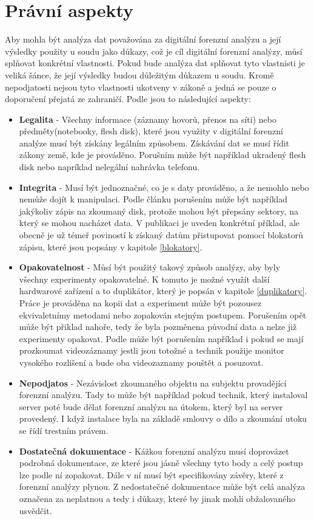 \documentclass[thesis=B,czech]{FITthesis}[2012/06/26]
\begin{document}
\section{Právní aspekty}

Aby mohla být analýza dat považována za digitální forenzní analýzu a její výsledky použity u soudu jako důkazy, což je cíl digitální forenzní analýzy, můsí splňovat konkrétní vlastnosti. Pokud bude analýza dat splňovat tyto vlastnisti je veliká šánce, že její výsledky budou důležitým důkazem u soudu. Kromě nepodjatosti nejsou tyto vlastnosti ukotveny v zákoně a jedná se pouze o doporučení přejatá ze zahraničí. Podle \cite{svetlik2010digitalni} jsou to následující aspekty:

\begin{itemize}

\item \textbf{Legalita} - Všechny informace (záznamy hovorů, přenos na síti) nebo předměty(notebooky, flesh disk), které jsou využity v digitální forenzní analýze musí být získány legálním způsobem. Získávání dat se musí řídit zákony země, kde je prováděno. Porušním může být například ukradený flesh disk nebo napríklad nelegální nahrávka telefonu. 
\item \textbf{Integrita} - Musí být jednoznačné, co je s daty prováděno, a že nemohlo nebo nemůže dojít k manipulaci. Podle článku \cite{svetlik2010digitalni} porušením může být například jakýkoliv zápis na zkoumaný disk, protože mohou být přepsány sektory, na který se mohou nacházet data. V publikaci je uveden konkrétní příklad, ale obecně je už témeř poviností k získaný datům přistupovat pomocí blokatorů zápisu, které jsou popsány v kapitole \ref{blokatory}.
\item \textbf{Opakovatelnost} - Můsí být použitý takový způsob analýzy, aby byly všechny experimenty opakovatelné. K tomuto je možné využít další hardwarové zařízení a to duplikátor, který je popsán v kapitole \ref{duplikatory}. Práce je prováděna na kopii dat a experiment může být pozousez ekvivaletnímy metodami nebo zopakován stejným postupem. Porušením opět může být přiklad nahoře, tedy že byla pozměnena původní data a nelze již experimenty opakovat. Podle \cite{svetlik2010digitalni} může být porušením například i pokud se mají prozkoumat videozáznamy jestli jsou totožné a technik použije monitor vysokého rozlišení a bude oba videozaznamy pouštět a posuzovat. 
\item \textbf{Nepodjatos} - Nezávislost zkoumaného objektu na subjektu provadějící forenzní analýzu. Tady to může být například pokud technik, který instaloval server poté bude dělat forenzní analýzu na útokem, který byl na server provedený. I když instalace byla na základě smlouvy o dílo a zkoumání utoku se řídí trestním právem. 
\item \textbf{Dostatečná dokumentace} - Kážkou forenzní analýzu musí doprovázet podrobná dokumentace, ze které jsou jásně všechny tyto body a celý postup lze podle ní zopakovat. Dále v ní musí být specifikovány závěry, které z forenzní analýzy plynou. Z nedostatečné dokumentace může být celá analýza označena za neplatnou a tedy i důkazy, které by jinak mohli obžalovaného usvědčit.

\end{itemize}
\end{document}

